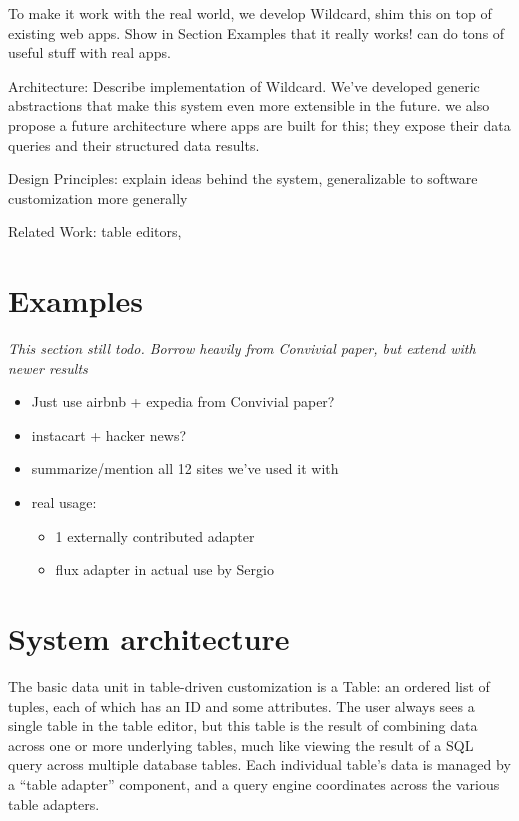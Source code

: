\documentclass[sigplan,10pt,anonymous,review]{acmart}
\providecommand{\tightlist}{%
  \setlength{\itemsep}{0pt}\setlength{\parskip}{0pt}}
\begin{document}
To make it work with the real world, we develop Wildcard, shim this on
top of existing web apps. Show in Section Examples that it really works!
can do tons of useful stuff with real apps.

Architecture: Describe implementation of Wildcard. We've developed
generic abstractions that make this system even more extensible in the
future. we also propose a future architecture where apps are built for
this; they expose their data queries and their structured data results.

Design Principles: explain ideas behind the system, generalizable to
software customization more generally

Related Work: table editors,

\hypertarget{examples}{%
\section{Examples}\label{examples}}

\emph{This section still todo. Borrow heavily from Convivial paper, but
extend with newer results}

\begin{itemize}
\tightlist
\item
  Just use airbnb + expedia from Convivial paper?
\item
  instacart + hacker news?
\item
  summarize/mention all 12 sites we've used it with
\item
  real usage:

  \begin{itemize}
  \tightlist
  \item
    1 externally contributed adapter
  \item
    flux adapter in actual use by Sergio
  \end{itemize}
\end{itemize}

\hypertarget{system-architecture}{%
\section{System architecture}\label{system-architecture}}

The basic data unit in table-driven customization is a Table: an ordered
list of tuples, each of which has an ID and some attributes. The user
always sees a single table in the table editor, but this table is the
result of combining data across one or more underlying tables, much like
viewing the result of a SQL query across multiple database tables. Each
individual table's data is managed by a ``table adapter'' component, and
a query engine coordinates across the various table adapters.
\end{document}
